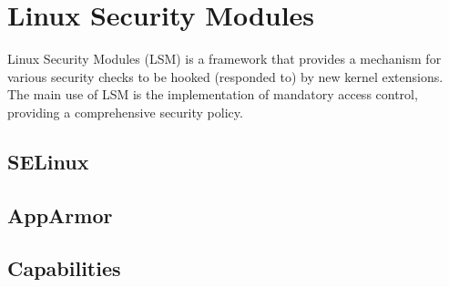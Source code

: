 
\section{Linux Security Modules}

Linux Security Modules (LSM) is a framework that provides a mechanism for
various security checks to be hooked (responded to) by new kernel
extensions\cite{wright-et-al-2002,security-lsm-since-linux-3.3}. The main use
of LSM is the implementation of mandatory access control, providing a
comprehensive security policy.

\subsection{SELinux}

\subsection{AppArmor}

\subsection{Capabilities}

